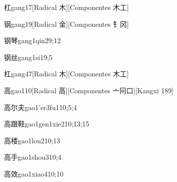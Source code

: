 \begin{verbete}{杠}{gang1}{7}[Radical ⽊][Componentes ⽊⼯]
\end{verbete}

\begin{verbete}{钢}{gang1}{9}[Radical 金][Componentes ⻐冈]
\end{verbete}

\begin{verbete}{钢琴}{gang1qin2}{9;12}
\end{verbete}

\begin{verbete}{钢丝}{gang1si1}{9;5}
\end{verbete}

\begin{verbete}{杠}{gang4}{7}[Radical ⽊][Componentes ⽊⼯]
\end{verbete}

\begin{verbete}{高}{gao1}{10}[Radical ⾼][Componentes 亠冋口][Kangxi 189]
\end{verbete}

\begin{verbete}{高尔夫}{gao1'er3fu1}{10;5;4}
\end{verbete}

\begin{verbete}{高跟鞋}{gao1gen1xie2}{10;13;15}
\end{verbete}

\begin{verbete}{高楼}{gao1lou2}{10;13}
\end{verbete}

\begin{verbete}{高手}{gao1shou3}{10;4}
\end{verbete}

\begin{verbete}{高效}{gao1xiao4}{10;10}
\end{verbete}

